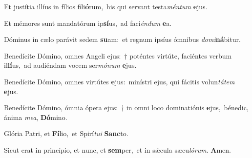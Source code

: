 \item Et justítia illíus in fílios fili\textbf{ó}rum,~\psstar his qui servant testa\textit{méntum} \textbf{e}jus.
\item Et mémores sunt mandatórum ip\textbf{sí}us,~\psstar ad faci\textit{éndum} \textbf{e}a.
\item Dóminus in cælo parávit sedem \textbf{su}am:~\psstar et regnum ipsíus ómnibus \textit{domi}\textbf{ná}bitur.
\item Benedícite Dómino, omnes Angeli ejus:~† poténtes virtúte, faciéntes verbum il\textbf{lí}us,~\psstar ad audiéndam vocem ser\textit{mónum} \textbf{e}jus.
\item Benedícite Dómino, omnes virtútes \textbf{e}jus:~\psstar minístri ejus, qui fácitis volun\textit{tátem} \textbf{e}jus.
\item Benedícite Dómino, ómnia ópera ejus:~† in omni loco dominatiónis \textbf{e}jus,~\psstar bénedic, ánima \textit{mea}, \textbf{Dó}mino.
\item Glória Patri, et \textbf{Fí}lio,~\psstar et Spirí\textit{tui} \textbf{Sanc}to.
\item Sicut erat in princípio, et nunc, et \textbf{sem}per,~\psstar et in sǽcula sæcu\textit{lórum}. \textbf{A}men.
